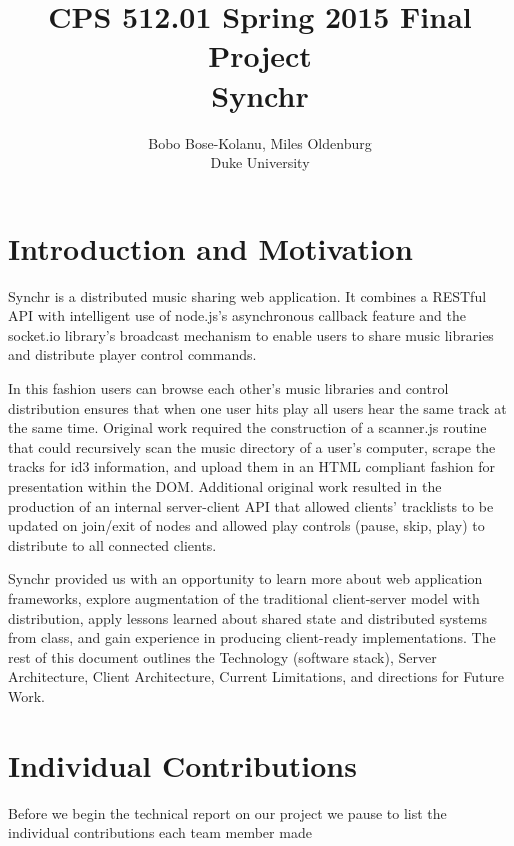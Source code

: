 \documentclass[12pt]{article}
\title{CPS 512.01 Spring 2015 Final Project \\ Synchr}
\author{Bobo Bose-Kolanu, Miles Oldenburg \\ Duke University}
\begin{document}
\maketitle

\newpage

\tableofcontents

\newpage

\section{Introduction and Motivation}

Synchr is a distributed music sharing web application. It combines a RESTful API with intelligent use of node.js's asynchronous callback feature and the socket.io library's broadcast mechanism to enable users to share music libraries and distribute player control commands. 

In this fashion users can browse each other's music libraries and control distribution ensures that when one user hits play all users hear the same track at the same time. Original work required the construction of a scanner.js routine that could recursively scan the music directory of a user's computer, scrape the tracks for id3 information, and upload them in an HTML compliant fashion for presentation within the DOM. Additional original work resulted in the production of an internal server-client API that allowed clients' tracklists to be updated on join/exit of nodes and allowed play controls (pause, skip, play) to distribute to all connected clients.

Synchr provided us with an opportunity to learn more about web application frameworks, explore augmentation of the traditional client-server model with distribution, apply lessons learned about shared state and distributed systems from class, and gain experience in producing client-ready implementations. The rest of this document outlines the Technology (software stack), Server Architecture, Client Architecture, Current Limitations, and directions for Future Work.

\section{Individual Contributions}
Before we begin the technical report on our project we pause to list the individual contributions each team member made
\\
\end{document}
